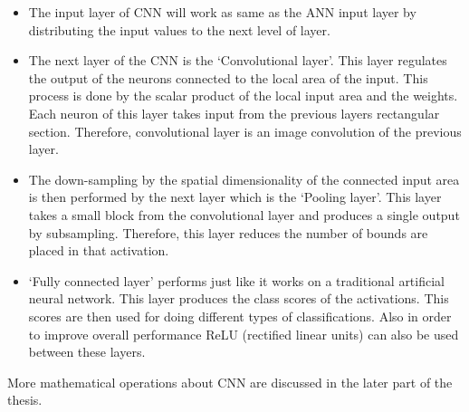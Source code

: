 \begin{itemize}

\item The input layer of CNN will work as same as the ANN input layer by distributing the input values to the next level of layer.
 

\item The next layer of the CNN is the `Convolutional layer'. This layer regulates the output of the neurons connected to the local area of the input. This process is done by the scalar product of the local input area and the weights. Each neuron of this layer takes input from the previous layers rectangular section. Therefore, convolutional layer is an image convolution of the previous layer. 

\item The down-sampling by the spatial dimensionality of the connected input area is then performed by the next layer which is the `Pooling layer'. This layer takes a small block from the convolutional layer and produces a single output by subsampling. Therefore, this layer reduces the number of bounds are placed in that activation. 

\item `Fully connected layer' performs just like it works on a traditional artificial neural network. This layer produces the class scores of the activations. This scores are then used for doing different types of classifications. Also in order to improve overall performance ReLU (rectified linear units) can also be used between these layers. 



\end{itemize}

More mathematical operations about CNN are discussed in the later part of the thesis. 

\begin{figure}
\centering
{}
\end{figure}






